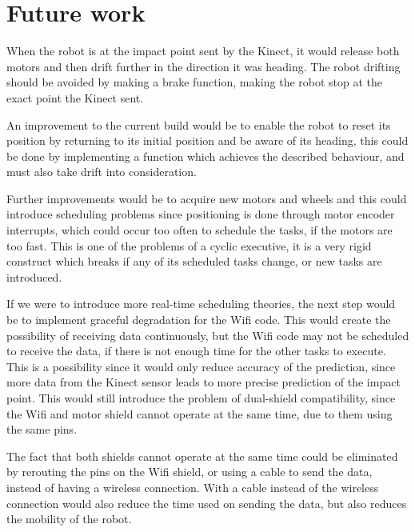 \chapter{Future work}
\label{chap:FutureWork}
When the robot is at the impact point sent by the Kinect, it would release both motors and then drift further in the direction it was heading. The robot drifting should be avoided by making a brake function, making the robot stop at the exact point the Kinect sent.

An improvement to the current build would be to enable the robot to reset its position by returning to its initial position and be aware of its heading, this could be done by implementing a function which achieves the described behaviour, and must also take drift into consideration.

Further improvements would be to acquire new motors and wheels and this could introduce scheduling problems since positioning is done through motor encoder interrupts, which could occur too often to schedule the tasks, if the motors are too fast.
This is one of the problems of a cyclic executive, it is a very rigid construct which breaks if any of its scheduled tasks change, or new tasks are introduced.

If we were to introduce more real-time scheduling theories, the next step would be to implement graceful degradation for the Wifi code. This would create the possibility of receiving data continuously, but the Wifi code may not be scheduled to receive the data, if there is not enough time for the other tasks to execute. This is a possibility since it would only reduce accuracy of the prediction, since more data from the Kinect sensor leads to more precise prediction of the impact point. This would still introduce the problem of dual-shield compatibility, since the Wifi and motor shield cannot operate at the same time, due to them using the same pins.

The fact that both shields cannot operate at the same time could be eliminated by rerouting the pins on the Wifi shield, or using a cable to send the data, instead of having a wireless connection. With a cable instead of the wireless connection would also reduce the time used on sending the data, but also reduces the mobility of the robot.
